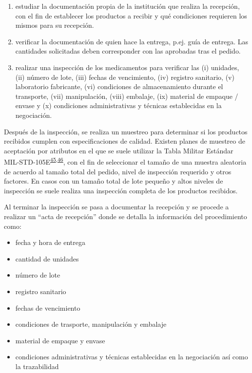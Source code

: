 \documentclass[
  oneside]{book}
\begin{document}
\begin{enumerate}
\def\labelenumi{\arabic{enumi}.}
\item
  estudiar la documentación propia de la institución que realiza la recepción, con el fin de establecer los productos a recibir y qué condiciones requieren los mismos para su recepción.
\item
  verificar la documentación de quien hace la entrega, p.ej. guía de entrega. Las cantidades solicitadas deben corresponder con las aprobadas tras el pedido.
\item
  realizar una inspección de los medicamentos para verificar las (i) unidades, (ii) número de lote, (iii) fechas de vencimiento, (iv) registro sanitario, (v) laboratorio fabricante, (vi) condiciones de almacenamiento durante el transporte, (vii) manipulación, (viii) embalaje, (ix) material de empaque / envase y (x) condiciones administrativas y técnicas establecidas en la negociación.
\end{enumerate}

Después de la inspección, se realiza un muestreo para determinar si los productos recibidos cumplen con especificaciones de calidad. Existen planes de muestreo de aceptación por atributos en el que se suele utilizar la Tabla Militar Estándar MIL-STD-105E\textsuperscript{\protect\hyperlink{ref-AmericanNationalStandardsInstitute2013}{45},\protect\hyperlink{ref-GutierrezPulido2008}{46}}, con el fin de seleccionar el tamaño de una muestra aleatoria de acuerdo al tamaño total del pedido, nivel de inspección requerido y otros factores. En casos con un tamaño total de lote pequeño y altos niveles de inspección se suele realiza una inspección completa de los productos recibidos.

Al terminar la inspección se pasa a documentar la recepción y se procede a realizar un ``acta de recepción'' donde se detalla la información del procedimiento como:

\begin{itemize}
\item
  fecha y hora de entrega
\item
  cantidad de unidades
\item
  número de lote
\item
  registro sanitario
\item
  fechas de vencimiento
\item
  condiciones de trasporte, manipulación y embalaje
\item
  material de empaque y envase
\item
  condiciones administrativas y técnicas establecidas en la negociación así como la trazabilidad
\end{itemize}
\end{document}
